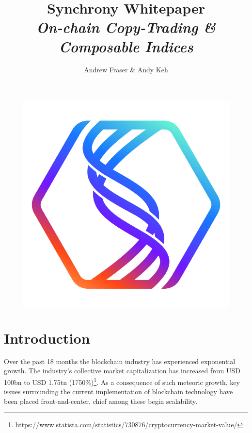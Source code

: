 \documentclass[10pt]{article}
\title{%
	\textbf{Synchrony Whitepaper}\\
	\emph{On-chain Copy-Trading \& Composable Indices}}
\author{Andrew Fraser \& Andy Keh}
\begin{document}
	\maketitle
	\begin{center}
		\begin{figure}[h]
			\includegraphics[scale=0.75]{SYNCHRONY-LOGO.png}
			\centering
		\end{figure}
	\end{center}

	\newpage
	\tableofcontents

	\newpage
		\section{Introduction}
			Over the past 18 months the blockchain industry has experienced exponential growth. The
			industry's collective market capitalization has increased from USD 100bn to USD 1.75tn
			(1750\%)\footnote[1]{https://www.statista.com/statistics/730876/cryptocurrency-market-value/}.
			As a consequence of such meteoric growth, key issues surrounding the current
			implementation of blockchain technology have been placed front-and-center, chief among
			these begin scalability. 
\end{document}
